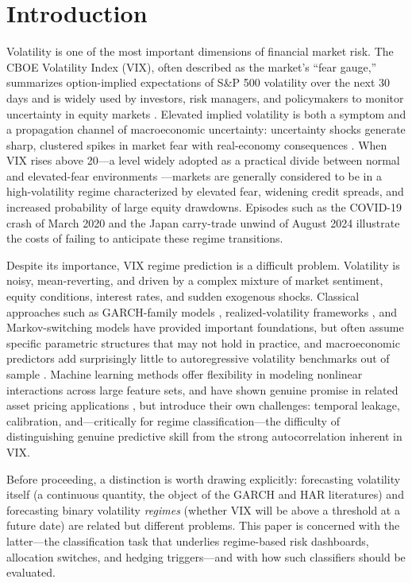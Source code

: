 \documentclass[12pt]{article}
\begin{document}
\section{Introduction}

Volatility is one of the most important dimensions of financial market risk. The CBOE Volatility
Index (VIX), often described as the market's ``fear gauge,'' summarizes option-implied
expectations of S\&P 500 volatility over the next 30 days and is widely used by investors, risk
managers, and policymakers to monitor uncertainty in equity markets \citep{whaley2009,
bekaert2014}. Elevated implied volatility is both a symptom and a propagation channel of
macroeconomic uncertainty: uncertainty shocks generate sharp, clustered spikes in market fear
with real-economy consequences \citep{bloom2009}. When VIX
rises above 20---a level widely adopted as a practical divide between normal and elevated-fear
environments \citep{whaley2009}---markets are generally considered to be in a high-volatility
regime characterized by elevated fear, widening credit spreads, and increased probability of large
equity drawdowns. Episodes such as the COVID-19 crash of March 2020 and the Japan carry-trade
unwind of August 2024 illustrate the costs of failing to anticipate these regime transitions.

Despite its importance, VIX regime prediction is a difficult problem. Volatility is noisy,
mean-reverting, and driven by a complex mixture of market sentiment, equity conditions, interest
rates, and sudden exogenous shocks. Classical approaches such as GARCH-family models
\citep{bollerslev1986}, realized-volatility frameworks \citep{andersen2003}, and
Markov-switching models \citep{hamilton1989} have provided important foundations, but often
assume specific parametric structures that may not hold in practice, and macroeconomic
predictors add surprisingly little to autoregressive volatility benchmarks out of sample
\citep{paye2012}. Machine learning methods offer flexibility in modeling nonlinear
interactions across large feature sets, and have shown genuine promise in related asset
pricing applications \citep{gu2020}, but introduce their own challenges: temporal leakage,
calibration, and---critically for regime classification---the difficulty of distinguishing
genuine predictive skill from the strong autocorrelation inherent in VIX.

Before proceeding, a distinction is worth drawing explicitly: forecasting volatility itself
(a continuous quantity, the object of the GARCH and HAR literatures) and forecasting binary
volatility \emph{regimes} (whether VIX will be above a threshold at a future date) are related
but different problems. This paper is concerned with the latter---the classification task that
underlies regime-based risk dashboards, allocation switches, and hedging triggers---and with how
such classifiers should be evaluated.
\end{document}
